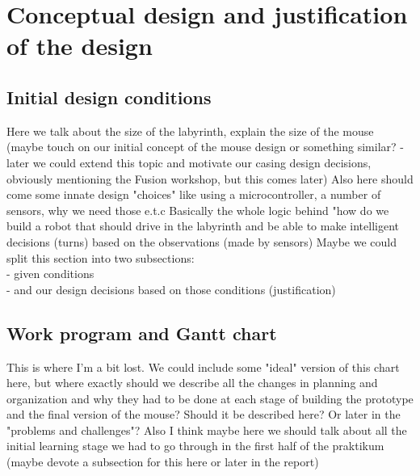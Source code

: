 \section{Conceptual design and justification of the design}

\subsection{Initial design conditions}
    Here we talk about the size of the labyrinth, explain the size of the mouse (maybe touch on our initial concept of the mouse design or something similar? - later we could extend this topic and motivate our casing design decisions, obviously mentioning the Fusion workshop, but this comes later)
    Also here should come some innate design "choices" like using a microcontroller, a number of sensors, why we need those e.t.c
    Basically the whole logic behind "how do we build a robot that should drive in the labyrinth and be able to make intelligent decisions (turns) based on the observations (made by sensors)
    Maybe we could split this section into two subsections:\\
    - given conditions\\
    - and our design decisions based on those conditions (justification)
    
\subsection{Work program and Gantt chart}
This is where I'm a bit lost. We could include some "ideal" version of this chart here, but where exactly should we describe all the changes in planning and organization and why they had to be done at each stage of building the prototype and the final version of the mouse?  Should it be described here? Or later in the "problems and challenges"?
Also I think maybe here we should talk about all the initial learning stage we had to go through in the first half of the praktikum (maybe devote a subsection for this here or later in the report)

